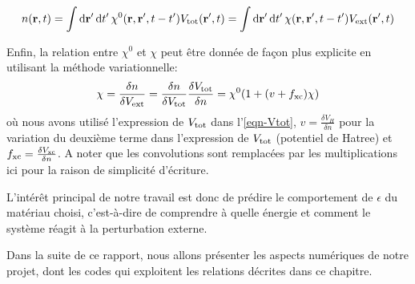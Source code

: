 \begin{equation}
  n(\vb{r}, t) = \int \dd{\vb{r}'} \dd{t'} \chi^0(\vb{r}, \vb{r}', t-t') V_{\textnormal{tot}}(\vb{r}', t)
               = \int \dd{\vb{r}'} \dd{t'} \chi(\vb{r}, \vb{r}', t-t') V_{\textnormal{ext}}(\vb{r}', t)
\end{equation}


Enfin, la relation entre $\chi^0$ et $\chi$ peut être donnée de façon plus explicite
en utilisant la méthode variationnelle:
\begin{equation}
  \label{eqn-chi0chi}
  \chi = \frac{\delta n}{\delta V_{\textnormal{ext}}}
       = \frac{\delta n}{\delta V_{\textnormal{tot}}} \frac{\delta V_{\textnormal{tot}}}{\delta n}
       = \chi^0 ( 1 + (v+f_{\textnormal{xc}})\chi)
\end{equation}
où nous avons utilisé l'expression de $V_{\textnormal{tot}}$ dans l'\cref{eqn-Vtot},
$v = \frac{\delta V_H}{\delta n}$ pour la variation du deuxième terme dans l'expression de $V_{\textnormal{tot}}$
(potentiel de Hatree) et $f_{\textnormal{xc}} = \frac{\delta V_{\textnormal{xc}}}{\delta n}$.
A noter que les convolutions sont remplacées par les multiplications ici pour la raison de simplicité d'écriture.

L'intérêt principal de notre travail est donc de prédire le comportement de $\epsilon$ du matériau choisi,
c'est-à-dire de comprendre à quelle énergie et comment le système réagit à la perturbation externe.

Dans la suite de ce rapport, nous allons présenter les aspects numériques de notre projet,
dont les codes qui exploitent les relations décrites dans ce chapitre.
